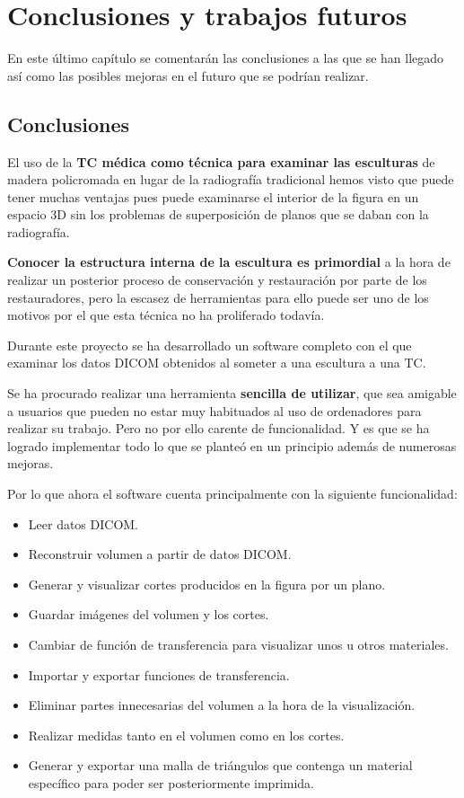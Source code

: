 \chapter{Conclusiones y trabajos futuros}

En este último capítulo se comentarán las conclusiones a las que se han llegado así como las posibles mejoras en el futuro que se podrían realizar.

\section{Conclusiones}

El uso de la \textbf{TC médica como técnica para examinar las esculturas} de madera policromada en lugar de la radiografía tradicional hemos visto que puede tener muchas ventajas pues puede examinarse el interior de la figura en un espacio 3D sin los problemas de superposición de planos que se daban con la radiografía.

\textbf{Conocer la estructura interna de la escultura es primordial} a la hora de realizar un posterior proceso de conservación y restauración por parte de los restauradores, pero la escasez de herramientas para ello puede ser uno de los motivos por el que esta técnica no ha proliferado todavía.

Durante este proyecto se ha desarrollado un software completo con el que examinar los datos DICOM obtenidos al someter a una escultura a una TC.

Se ha procurado realizar una herramienta \textbf{sencilla de utilizar}, que sea amigable a usuarios que pueden no estar muy habituados al uso de ordenadores para realizar su trabajo. Pero no por ello carente de funcionalidad. Y es que se ha logrado implementar todo lo que se planteó en un principio además de numerosas mejoras.

Por lo que ahora el software cuenta principalmente con la siguiente funcionalidad:

\begin{itemize}
	\item Leer datos DICOM.
	\item Reconstruir volumen a partir de datos DICOM.
	\item Generar y visualizar cortes producidos en la figura por un plano.
	\item Guardar imágenes del volumen y los cortes.
	\item Cambiar de función de transferencia para visualizar unos u otros materiales.
	\item Importar y exportar funciones de transferencia.
	\item Eliminar partes innecesarias del volumen a la hora de la visualización.
	\item Realizar medidas tanto en el volumen como en los cortes.
	\item Generar y exportar una malla de triángulos que contenga un material específico para poder ser posteriormente imprimida.
\end{itemize}

